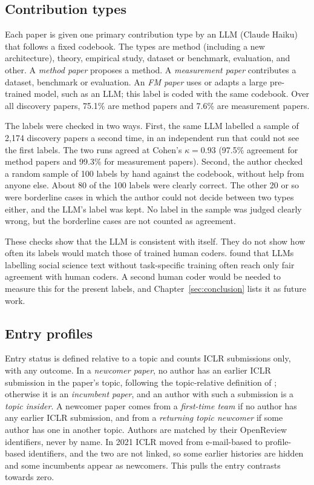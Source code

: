 \subsection{Contribution types}
Each paper is given one primary contribution type by an LLM (Claude Haiku) that follows a fixed codebook. The types are
method (including a new architecture), theory, empirical study, dataset or benchmark, evaluation, and other. A
\emph{method paper} proposes a method. A \emph{measurement paper} contributes a dataset, benchmark or evaluation. An
\emph{FM paper} uses or adapts a large pre-trained model, such as an LLM; this label is coded with the same codebook.
Over all discovery papers, 75.1\% are method papers and 7.6\% are measurement papers.

The labels were checked in two ways. First, the same LLM labelled a sample of 2,174 discovery papers a second time, in
an independent run that could not see the first labels. The two runs agreed at Cohen's $\kappa = 0.93$ (97.5\%
agreement for method papers and 99.3\% for measurement papers). Second, the author checked a random sample of 100 labels
by hand against the codebook, without help from anyone else. About 80 of the 100 labels were clearly correct. The other
20 or so were borderline cases in which the author could not decide between two types either, and the LLM's label was
kept. No label in the sample was judged clearly wrong, but the borderline cases are not counted as agreement.

These checks show that the LLM is consistent with itself. They do not show how often its labels would match those of
trained human coders. \citet{ziems2024can} found that LLMs labelling social science text without task-specific
training often reach only fair agreement with human coders. A second human coder would be needed to measure this for
the present labels, and Chapter~\ref{sec:conclusion} lists it as future work.

\subsection{Entry profiles}
Entry status is defined relative to a topic and counts ICLR submissions only, with any outcome. In a \emph{newcomer
paper}, no author has an earlier ICLR submission in the paper's topic, following the topic-relative definition of
\citet{biliotti2024breaking}; otherwise it is an \emph{incumbent paper}, and an author with such a submission is a
\emph{topic insider}. A newcomer paper comes from a \emph{first-time team} if no author has any earlier ICLR
submission, and from a \emph{returning topic newcomer} if some author has one in another topic. Authors are matched by
their OpenReview identifiers, never by name. In 2021 ICLR moved from e-mail-based to profile-based identifiers, and the
two are not linked, so some earlier histories are hidden and some incumbents appear as newcomers. This pulls the entry
contrasts towards zero.

